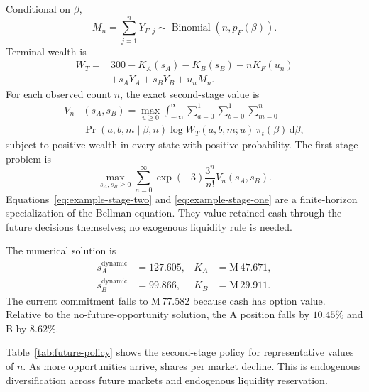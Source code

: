 \documentclass[journal, a4paper]{IEEEtran}
\begin{document}
Conditional on $\beta$,
\begin{equation}
M_n=\sum_{j=1}^{n}Y_{F,j}
\sim
\operatorname{Binomial}\left(n,p_F(\beta)\right).
\end{equation}
Terminal wealth is
\begin{equation}
\begin{split}
W_T={}&300-K_A(s_A)-K_B(s_B)-nK_F(u_n)\\
&+s_A Y_A+s_B Y_B+u_n M_n.
\end{split}
\label{eq:example-terminal-dynamic}
\end{equation}
For each observed count $n$, the exact second-stage value is
\begin{align}
V_n&(s_A,s_B)
=\max_{u\geq0}
\int_{-\infty}^{\infty}
\sum_{a=0}^{1}\sum_{b=0}^{1}\sum_{m=0}^{n} \nonumber
\\&\Pr(a,b,m\mid\beta,n) \log W_T(a,b,m;u)\,
\pi_t(\beta)\,\mathrm{d}\beta,
\label{eq:example-stage-two}
\end{align}
subject to positive wealth in every state with positive probability. The first-stage problem is
\begin{equation}
\max_{s_A,s_B\geq0}
\sum_{n=0}^{\infty}
\exp(-3)\frac{3^n}{n!}
V_n(s_A,s_B).
\label{eq:example-stage-one}
\end{equation}
Equations~\eqref{eq:example-stage-two} and \eqref{eq:example-stage-one} are a finite-horizon specialization of the Bellman equation. They value retained cash through the future decisions themselves; no exogenous liquidity rule is needed.

The numerical solution is
\begin{align}
 s_A^{\mathrm{dynamic}}&=127.605, & K_A&=\text{M}\,47.671,\\
 s_B^{\mathrm{dynamic}}&= 99.866, & K_B&=\text{M}\,29.911.
\end{align}
The current commitment falls to M\,77.582 because cash has option value. Relative to the no-future-opportunity solution, the A position falls by $10.45\%$ and B by $8.62\%$.

Table~\ref{tab:future-policy} shows the second-stage policy for representative values of $n$. As more opportunities arrive, shares per market decline. This is endogenous diversification across future markets and endogenous liquidity reservation.
\end{document}
